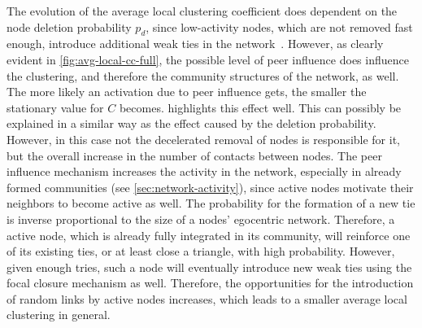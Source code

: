 The evolution of the average local clustering coefficient does dependent on the node deletion probability \( p_{d} \), since low-activity nodes, which are not removed fast enough, introduce additional weak ties in the network~\cite{Laurent2015}.
However, as clearly evident in \cref{fig:avg-local-cc-full}, the possible level of peer influence does influence the clustering, and therefore the community structures of the network, as well.
The more likely an activation due to peer influence gets, the smaller the stationary value for \( C \) becomes.
 highlights this effect well.
This can possibly be explained in a similar way as the effect caused by the deletion probability.
However, in this case not the decelerated removal of nodes is responsible for it, but the overall increase in the number of contacts between nodes.
The peer influence mechanism increases the activity in the network, especially in already formed communities (see \cref{sec:network-activity}), since active nodes motivate their neighbors to become active as well.
The probability for the formation of a new tie is inverse proportional to the size of a nodes' egocentric network.
Therefore, a active node, which is already fully integrated in its community, will reinforce one of its existing ties, or at least close a triangle, with high probability.
However, given enough tries, such a node will eventually introduce new weak ties using the focal closure mechanism as well.
Therefore, the opportunities for the introduction of random links by active nodes increases, which leads to a smaller average local clustering in general.

